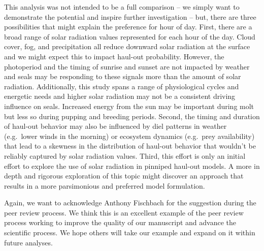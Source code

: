 \documentclass[fleqn,10pt,lineno]{wlpeerj} %
\begin{document}
This analysis was not intended to be a full comparison --
we simply want to demonstrate the potential and inspire further investigation --
but, there are three possibilities that might explain the preference for hour of
day. First, there are a broad range of solar radiation values represented for each
hour of the day. Cloud cover, fog, and precipitation all reduce downward solar
radiation at the surface and we might expect this to impact haul-out
probability. However, the photoperiod and the timing of sunrise and sunset are
not impacted by weather and seals may be responding to these signals more than
the amount of solar radiation. Additionally, this study spans a range of
physiological cycles and energetic needs and higher solar radiation may not be a
consistent driving influence on seals. Increased energy from the sun may be
important during molt but less so during pupping and breeding periods. Second,
the timing and duration of haul-out behavior may also be influenced by diel
patterns in weather (e.g.~lower winds in the morning) or ecosystem dynamics
(e.g.~prey availability) that lead to a skewness in the distribution of haul-out
behavior that wouldn't be reliably captured by solar radiation values. Third,
this effort is only an initial effort to explore the use of solar radiation in
pinniped haul-out models. A more in depth and rigorous exploration of this topic
might discover an approach that results in a more parsimonious and preferred
model formulation.

Again, we want to acknowledge Anthony Fischbach for the suggestion during the
peer review process. We think this is an excellent example of the peer review
process working to improve the quality of our manuscript and advance the
scientific process. We hope others will take our example and expand on it
within future analyses.
\end{document}
